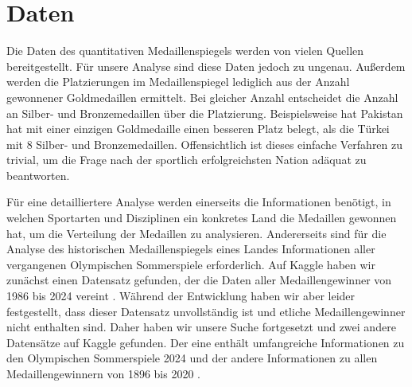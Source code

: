 \section{Daten}
Die Daten des quantitativen Medaillenspiegels werden von vielen Quellen bereitgestellt. Für unsere Analyse sind diese Daten jedoch zu ungenau. Außerdem werden die Platzierungen im Medaillenspiegel lediglich aus der Anzahl gewonnener Goldmedaillen ermittelt. Bei gleicher Anzahl entscheidet die Anzahl an Silber- und Bronzemedaillen über die Platzierung. Beispielsweise hat Pakistan hat mit einer einzigen Goldmedaille einen besseren Platz belegt, als die Türkei mit 8 Silber- und Bronzemedaillen. Offensichtlich ist dieses einfache Verfahren zu trivial, um die Frage nach der sportlich erfolgreichsten Nation adäquat zu beantworten.

Für eine detailliertere Analyse werden einerseits die Informationen benötigt, in welchen Sportarten und Disziplinen ein konkretes Land die Medaillen gewonnen hat, um die Verteilung der Medaillen zu analysieren. Andererseits sind für die Analyse des historischen Medaillenspiegels eines Landes Informationen aller vergangenen Olympischen Sommerspiele erforderlich. Auf Kaggle haben wir zunächst einen Datensatz gefunden, der die Daten aller Medaillengewinner von 1986 bis 2024 vereint \cite{kaggleWrongData}. Während der Entwicklung haben wir aber leider festgestellt, dass dieser Datensatz unvollständig ist und etliche Medaillengewinner nicht enthalten sind. Daher haben wir unsere Suche fortgesetzt und zwei andere Datensätze auf Kaggle gefunden. Der eine enthält umfangreiche Informationen zu den Olympischen Sommerspiele 2024 \cite{kaggleOly24} und der andere Informationen zu allen Medaillengewinnern von 1896 bis 2020 \cite{kaggleOlyHist}.

